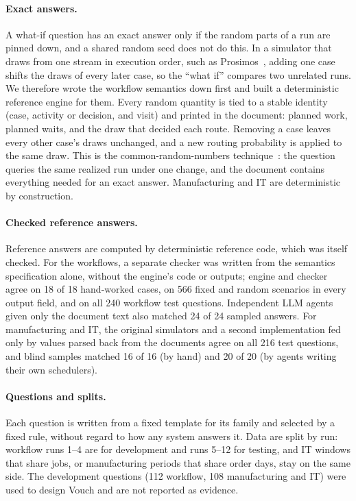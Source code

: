 \paragraph{Exact answers.} A what-if question has an exact answer only if the random parts of a run are pinned down, and a shared random seed does not do this. In a simulator that draws from one stream in execution order, such as Prosimos~\cite{lopezpintado2023prosimos}, adding one case shifts the draws of every later case, so the ``what if'' compares two unrelated runs. We therefore wrote the workflow semantics down first and built a deterministic reference engine for them. Every random quantity is tied to a stable identity (case, activity or decision, and visit) and printed in the document: planned work, planned waits, and the draw that decided each route. Removing a case leaves every other case's draws unchanged, and a new routing probability is applied to the same draw. This is the common-random-numbers technique~\cite{law2015simulation}: the question queries the same realized run under one change, and the document contains everything needed for an exact answer. Manufacturing and IT are deterministic by construction.

\paragraph{Checked reference answers.} Reference answers are computed by deterministic reference code, which was itself checked. For the workflows, a separate checker was written from the semantics specification alone, without the engine's code or outputs; engine and checker agree on 18 of 18 hand-worked cases, on 566 fixed and random scenarios in every output field, and on all 240 workflow test questions. Independent LLM agents given only the document text also matched 24 of 24 sampled answers. For manufacturing and IT, the original simulators and a second implementation fed only by values parsed back from the documents agree on all 216 test questions, and blind samples matched 16 of 16 (by hand) and 20 of 20 (by agents writing their own schedulers).

\paragraph{Questions and splits.} Each question is written from a fixed template for its family and selected by a fixed rule, without regard to how any system answers it. Data are split by run: workflow runs 1--4 are for development and runs 5--12 for testing, and IT windows that share jobs, or manufacturing periods that share order days, stay on the same side. The development questions (112 workflow, 108 manufacturing and IT) were used to design Vouch and are not reported as evidence.

